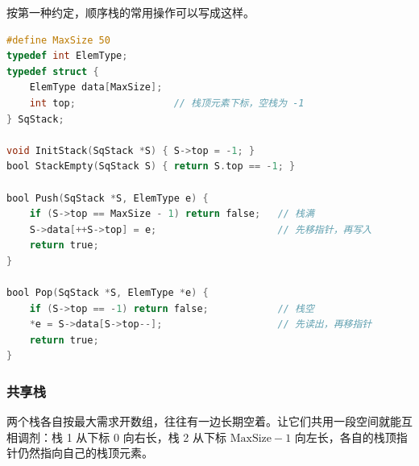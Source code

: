 按第一种约定，顺序栈的常用操作可以写成这样。

\begin{lstlisting}[language=C]
#define MaxSize 50
typedef int ElemType;
typedef struct {
    ElemType data[MaxSize];
    int top;                 // 栈顶元素下标，空栈为 -1
} SqStack;

void InitStack(SqStack *S) { S->top = -1; }
bool StackEmpty(SqStack S) { return S.top == -1; }

bool Push(SqStack *S, ElemType e) {
    if (S->top == MaxSize - 1) return false;   // 栈满
    S->data[++S->top] = e;                     // 先移指针，再写入
    return true;
}

bool Pop(SqStack *S, ElemType *e) {
    if (S->top == -1) return false;            // 栈空
    *e = S->data[S->top--];                    // 先读出，再移指针
    return true;
}
\end{lstlisting}

\subsubsection*{共享栈}

两个栈各自按最大需求开数组，往往有一边长期空着。让它们共用一段空间就能互相调剂：栈 1 从下标 $0$ 向右长，栈 2 从下标 $\text{MaxSize}-1$ 向左长，各自的栈顶指针仍然指向自己的栈顶元素。

